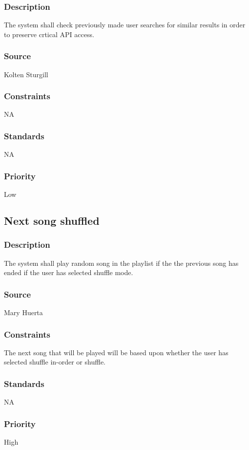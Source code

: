 \subsubsection{Description}
The system shall check previously made user searches for similar results in order to preserve crtical API access.
\subsubsection{Source}
Kolten Sturgill
\subsubsection{Constraints}
NA
\subsubsection{Standards}
NA
\subsubsection{Priority}
Low



\subsection{Next song shuffled}
\subsubsection{Description}
The system shall play random song in the playlist if the the previous song has ended if the user has selected shuffle mode.
\subsubsection{Source}
Mary Huerta
\subsubsection{Constraints}
The next song that will be played will be based upon whether the user has selected shuffle in-order or shuffle.
\subsubsection{Standards}
NA
\subsubsection{Priority}
High



